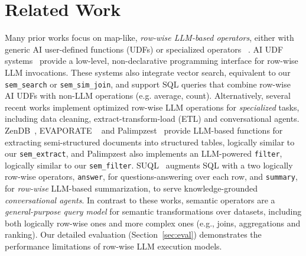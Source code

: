 \section{Related Work}

Many prior works focus on map-like, \emph{row-wise LLM-based operators}, either with generic AI user-defined functions (UDFs) or specialized operators ~\cite{liu_declarative_2024, lin_towards_2024, arora_language_2023, liu_suql_2024}. 
AI UDF systems~\cite{motherduck_introducing_nodate, williamdassafmsft_intelligent_2024, noauthor_snow_nodate,  databricks, noauthor_large_nodate, liu_optimizing_2024}  provide a low-level, non-declarative programming interface for row-wise LLM invocations. These systems also integrate vector search, equivalent to our \verb|sem_search| or \verb|sem_sim_join|, and support SQL queries that combine row-wise AI UDFs with non-LLM operations (e.g. average, count).
Alternatively, several recent works implement optimized row-wise LLM operations for \emph{specialized} tasks, including data cleaning, extract-transform-load (ETL) and conversational agents.
ZenDB~\cite{lin_towards_2024}, EVAPORATE ~\cite{arora_language_2023} and Palimpzest~\cite{liu_declarative_2024} provide LLM-based functions for extracting semi-structured documents into structured tables, logically similar to our \verb|sem_extract|, and Palimpzest also implements an LLM-powered \verb|filter|, logically similar to our \verb|sem_filter|.
SUQL~\cite{liu_suql_2024} augments SQL with a two logically row-wise operators, \verb|answer|, for questions-answering over each row, and \verb|summary|, for \emph{row-wise} LLM-based summarization, to serve knowledge-grounded \emph{conversational agents}.
In contrast to these works, semantic operators are a \emph{general-purpose query model} for semantic transformations over datasets, including both logically row-wise ones and more complex ones (e.g., joins, aggregations and ranking). 
Our detailed evaluation (Section~\ref{sec:eval}) demonstrates the performance limitations of  row-wise LLM execution models.



